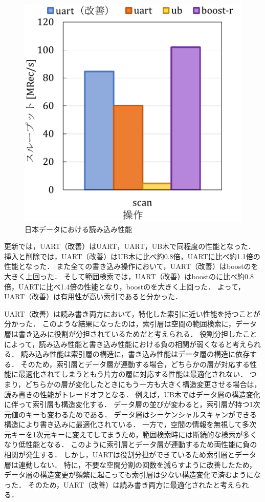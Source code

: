 \begin{figure}[tb]
\begin{minipage}[c]{0.495\textwidth}
    \includegraphics[scale=0.5]{./figures/graph-japan-read.pdf}
    \caption{日本データにおける読み込み性能}
    \label{graph:japan-sc}
  \end{minipage}
\end{figure}
更新では，UART（改善）はUART，UART，UB木で同程度の性能となった．
挿入と削除では，UART（改善）はUB木に比べ約0.8倍，UARTに比べ約1.1倍の性能となった．
また全ての書き込み操作において，UART（改善）はboostの\RTree を大きく上回った．
そして範囲検索では，UART（改善）はboostの\BTree に比べ約0.8倍，UARTに比べ1.4倍の性能となり，boostの\RTree を大きく上回った．
よって，UART（改善）は有用性が高い索引であると分かった．

UART（改善）は読み書き両方において，特化した索引に近い性能を持つことが分かった．
このような結果になったのは，索引層は空間の範囲検索に，データ層は書き込みに役割が分担されているためだと考えられる．
役割分担したことによって，読み込み性能と書き込み性能における負の相関が弱くなると考えられる．
読み込み性能は索引層の構造に，書き込み性能はデータ層の構造に依存する．
そのため，索引層とデータ層が連動する場合，どちらかの層が対応する性能に最適化されてしまうともう片方の層に対応する性能は最適化されない．
つまり，どちらかの層が変化したときにもう一方も大きく構造変更させる場合は，読み書きの性能がトレードオフとなる．
例えば，UB木ではデータ層の構造変化に伴って索引層も構造変化する．
データ層の並びが変わると，索引層が持つ1次元値のキーも変わるためである．
データ層はシーケンシャルスキャンができる構造により書き込みに最適化されている．
一方で，空間の情報を無視して多次元キーを1次元キーに変えてしてまうため，範囲検索時には断続的な検索が多くなり低性能となる．
このように索引層とデータ層が連動するため両性能に負の相関が発生する．
しかし，UARTは役割分担ができているため索引層とデータ層は連動しない．
特に，不要な空間分割の回数を減らすように改善したため，データ層の構造変更が頻繁に起こっても索引層は少ない構造変化で済むようになった．
そのため，UART（改善）は読み書き両方に最適化されたと考えられる．






